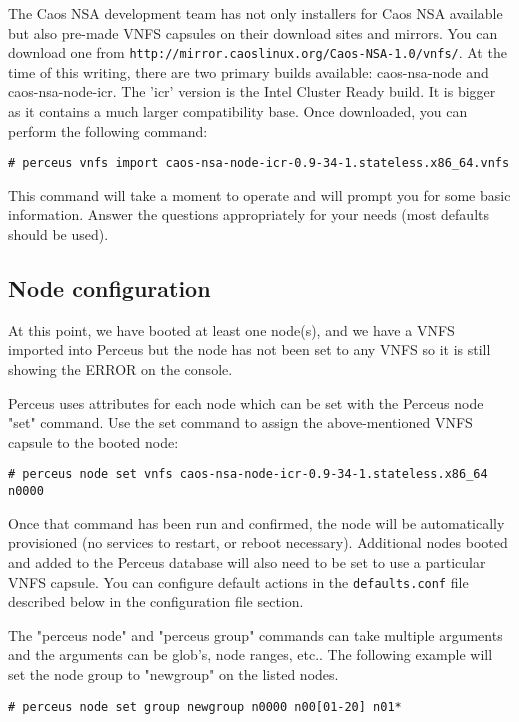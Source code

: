 \documentclass[10pt,letterpaper]{article}
\begin{document}
The Caos NSA development team has not only installers for Caos NSA available
but also pre-made VNFS capsules on their download sites and mirrors. You
can download one from {\tt http://mirror.caoslinux.org/Caos-NSA-1.0/vnfs/}.
At the time of this writing, there are two primary builds available:
caos-nsa-node and caos-nsa-node-icr. The 'icr' version is the Intel Cluster
Ready build. It is bigger as it contains a much larger compatibility base.
Once downloaded, you can perform the following command:

\begin{verbatim}
# perceus vnfs import caos-nsa-node-icr-0.9-34-1.stateless.x86_64.vnfs
\end{verbatim}

This command will take a moment to operate and will prompt you for some
basic information. Answer the questions appropriately for your needs (most
defaults should be used).

\subsection{Node configuration}
At this point, we have booted at least one node(s), and we have a VNFS
imported into Perceus but the node has not been set to any VNFS so it is
still showing the ERROR on the console.

Perceus uses attributes for each node which can be set with the Perceus node
"set" command. Use the set command to assign the above-mentioned VNFS capsule
to the booted node:

\begin{verbatim}
# perceus node set vnfs caos-nsa-node-icr-0.9-34-1.stateless.x86_64 n0000
\end{verbatim}

Once that command has been run and confirmed, the node will be automatically
provisioned (no services to restart, or reboot necessary). Additional nodes
booted and added to the Perceus database will also need to be set to use a
particular VNFS capsule. You can configure default actions in the
{\tt defaults.conf} file described below in the configuration file section.

The "perceus node" and "perceus group" commands can take multiple arguments and
the arguments can be glob's, node ranges, etc.. The following example will set
the node group to "newgroup" on the listed nodes.

\begin{verbatim}
# perceus node set group newgroup n0000 n00[01-20] n01*
\end{verbatim}
\end{document}
